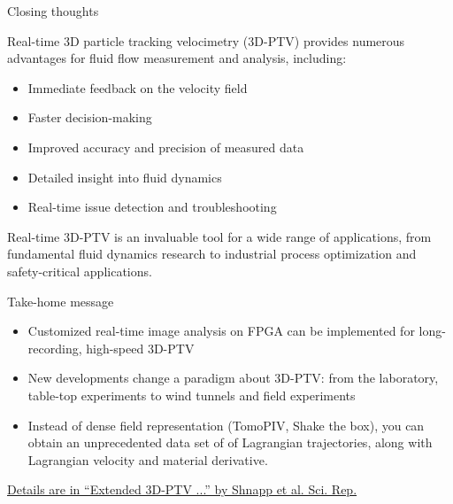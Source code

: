 \documentclass[preprint, aspectratio=43]{beamer}
\begin{document}



\begin{frame}{Closing thoughts}

Real-time 3D particle tracking velocimetry (3D-PTV) provides numerous advantages for fluid flow measurement and analysis, including:

\begin{itemize}
\item Immediate feedback on the velocity field
\item Faster decision-making
\item Improved accuracy and precision of measured data
\item Detailed insight into fluid dynamics
\item Real-time issue detection and troubleshooting
\end{itemize}

Real-time 3D-PTV is an invaluable tool for a wide range of applications, from fundamental fluid dynamics research to industrial process optimization and safety-critical applications.

\end{frame}


\begin{frame}{Take-home message}
  \begin{itemize}
  \item Customized real-time image analysis on FPGA can be implemented for long-recording, high-speed 3D-PTV
  \item New developments change a paradigm about 3D-PTV: from the laboratory, table-top experiments to wind tunnels and field experiments
  \item Instead of dense field representation (TomoPIV, Shake the box),  you can obtain an unprecedented data set of of Lagrangian trajectories, along with Lagrangian velocity and material derivative. 
  \end{itemize}
  
  \begin{cardTiny}\href{https://www.nature.com/articles/s41598-019-43555-2}{Details are in ``Extended 3D-PTV ...'' by Shnapp et al. Sci. Rep.}
  \end{cardTiny}
  
  \end{frame}
  
\end{document}
